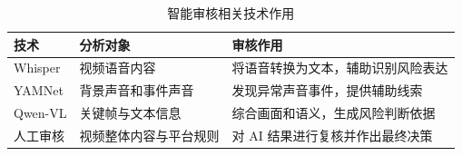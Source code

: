 \begin{table}[htbp]
  \centering
  \caption{智能审核相关技术作用}
  \label{tab:audit-tech-summary-revised}
  \begin{tabular}{p{}p{}p{}}
    \hline
    \textbf{技术} & \textbf{分析对象} & \textbf{审核作用} \\
    \hline
    Whisper & 视频语音内容 & 将语音转换为文本，辅助识别风险表达 \\
    YAMNet & 背景声音和事件声音 & 发现异常声音事件，提供辅助线索 \\
    Qwen-VL & 关键帧与文本信息 & 综合画面和语义，生成风险判断依据 \\
    人工审核 & 视频整体内容与平台规则 & 对 AI 结果进行复核并作出最终决策 \\
    \hline
  \end{tabular}
\end{table}
